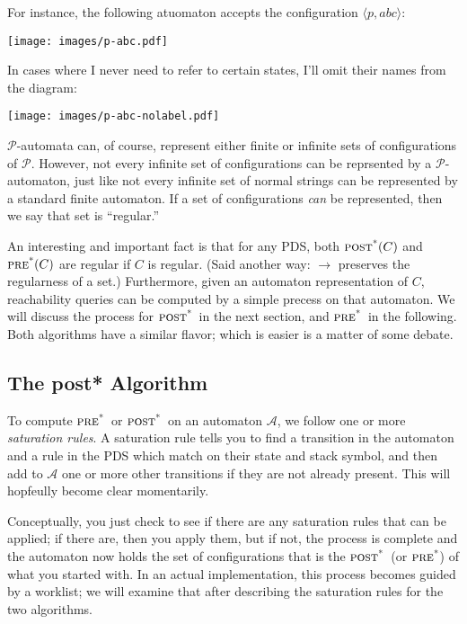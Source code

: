 \documentclass{article}
\newcommand{\Config}[2]{\ensuremath{\langle #1, #2 \rangle}}
\newcommand{\poststar}{\ensuremath{\textsc{post}^\textsc{*}}}
\newcommand{\prestar}{\ensuremath{\textsc{pre}^\textsc{*}}}
\begin{document}
For instance, the following atuomaton accepts the configuration
\Config{p}{abc}:\\
\begin{center}
  \texttt{[image: images/p-abc.pdf]}
\end{center}

In cases where I never need to refer to certain states, I'll omit
their names from the diagram:\\
\begin{center}
  \texttt{[image: images/p-abc-nolabel.pdf]}
\end{center}

$\mathcal{P}$-automata can, of course, represent either finite or
infinite sets of configurations of $\mathcal{P}$. However, not every
infinite set of configurations can be reprsented by a
$\mathcal{P}$-automaton, just like not every infinite set of normal
strings can be represented by a standard finite automaton. If a set of
configurations \emph{can} be represented, then we say that set is
``regular.''

An interesting and important fact is that for any PDS, both
$\poststar(C)$ and $\prestar(C)$ are regular if $C$ is regular. (Said
another way: $\rightarrow$ preserves the regularness of a set.)
Furthermore, given an automaton representation of $C$, reachability
queries can be computed by a simple precess on that automaton. We will
discuss the process for \poststar\ in the next section, and
\prestar\ in the following. Both algorithms have a similar flavor;
which is easier is a matter of some debate.


\subsection{The post* Algorithm}

To compute \prestar\ or \poststar\ on an automaton $\mathcal{A}$, we
follow one or more \emph{saturation rules}. A saturation rule tells
you to find a transition in the automaton and a rule in the PDS which
match on their state and stack symbol, and then add to $\mathcal{A}$
one or more other transitions if they are not already present. This
will hopfeully become clear momentarily.

Conceptually, you just check to see if there are any saturation rules
that can be applied; if there are, then you apply them, but if not,
the process is complete and the automaton now holds the set of
configurations that is the \poststar\ (or \prestar) of what you
started with. In an actual implementation, this process becomes guided
by a worklist; we will examine that after describing the saturation
rules for the two algorithms.
\end{document}
